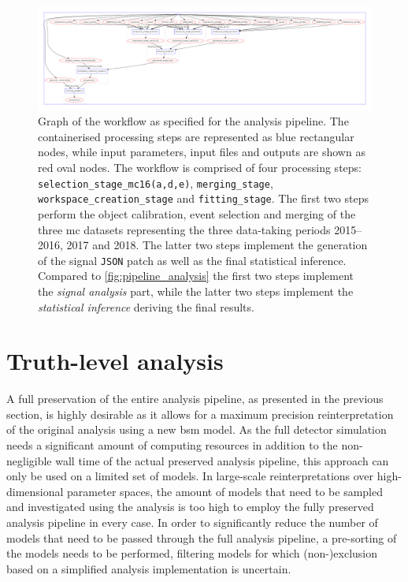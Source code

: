  \begin{figure}
	\centering\includegraphics[width=1.0\textwidth]{yadage_workflow_instance}
	\caption{Graph of the workflow as specified for the analysis pipeline. The containerised processing steps are represented as blue rectangular nodes, while input parameters, input files and outputs are shown as red oval nodes. The workflow is comprised of four processing steps: \texttt{selection\_stage\_mc16(a,d,e)}, \texttt{merging\_stage}, \texttt{workspace\_creation\_stage} and \texttt{fitting\_stage}. The first two steps perform the object calibration, event selection and merging of the three \gls{mc} datasets representing the three data-taking periods 2015--2016, 2017 and 2018. The latter two steps implement the generation of the signal \texttt{JSON} patch as well as the final statistical inference. Compared to \cref{fig:pipeline_analysis} the first two steps implement the \textit{signal analysis} part, while the latter two steps implement the \textit{statistical inference} deriving the final results.} 
	\label{fig:recast_workflow}
\end{figure}


\FloatBarrier

\section{Truth-level analysis}\label{sec:truth_analysis}

\ifpdf
    \graphicspath{{chapter-pmssm/Figs/Raster/}{chapter-pmssm/Figs/PDF/}{chapter-pmssm/Figs/}}
\else
    \graphicspath{{chapter-pmssm/Figs/Vector/}{chapter-pmssm/Figs/}}
\fi

A full preservation of the entire analysis pipeline, as presented in the previous section, is highly desirable as it allows for a maximum precision reinterpretation of the original analysis using a new \gls{bsm} model.
As the full detector simulation needs a significant amount of computing resources in addition to the non-negligible wall time of the actual preserved analysis pipeline, this approach can only be used on a limited set of models.
In large-scale reinterpretations over high-dimensional parameter spaces, the amount of models that need to be sampled and investigated using the analysis is too high to employ the fully preserved analysis pipeline in every case.
In order to significantly reduce the number of models that need to be passed through the full analysis pipeline, a pre-sorting of the models needs to be performed, filtering models for which (non-)exclusion based on a simplified analysis implementation is uncertain.

